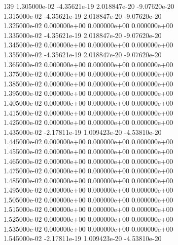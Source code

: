 139	1.305000e-02	-4.35621e-19	2.018847e-20	-9.07620e-20	\\ 	1.315000e-02	-4.35621e-19	2.018847e-20	-9.07620e-20	\\ 	1.325000e-02	0.000000e+00	0.000000e+00	0.000000e+00	\\ 	1.335000e-02	-4.35621e-19	2.018847e-20	-9.07620e-20	\\ 	1.345000e-02	0.000000e+00	0.000000e+00	0.000000e+00	\\ 	1.355000e-02	-4.35621e-19	2.018847e-20	-9.07620e-20	\\ 	1.365000e-02	0.000000e+00	0.000000e+00	0.000000e+00	\\ 	1.375000e-02	0.000000e+00	0.000000e+00	0.000000e+00	\\ 	1.385000e-02	0.000000e+00	0.000000e+00	0.000000e+00	\\ 	1.395000e-02	0.000000e+00	0.000000e+00	0.000000e+00	\\ 	1.405000e-02	0.000000e+00	0.000000e+00	0.000000e+00	\\ 	1.415000e-02	0.000000e+00	0.000000e+00	0.000000e+00	\\ 	1.425000e-02	0.000000e+00	0.000000e+00	0.000000e+00	\\ 	1.435000e-02	-2.17811e-19	1.009423e-20	-4.53810e-20	\\ 	1.445000e-02	0.000000e+00	0.000000e+00	0.000000e+00	\\ 	1.455000e-02	0.000000e+00	0.000000e+00	0.000000e+00	\\ 	1.465000e-02	0.000000e+00	0.000000e+00	0.000000e+00	\\ 	1.475000e-02	0.000000e+00	0.000000e+00	0.000000e+00	\\ 	1.485000e-02	0.000000e+00	0.000000e+00	0.000000e+00	\\ 	1.495000e-02	0.000000e+00	0.000000e+00	0.000000e+00	\\ 	1.505000e-02	0.000000e+00	0.000000e+00	0.000000e+00	\\ 	1.515000e-02	0.000000e+00	0.000000e+00	0.000000e+00	\\ 	1.525000e-02	0.000000e+00	0.000000e+00	0.000000e+00	\\ 	1.535000e-02	0.000000e+00	0.000000e+00	0.000000e+00	\\ 	1.545000e-02	-2.17811e-19	1.009423e-20	-4.53810e-20	\\ \hline
